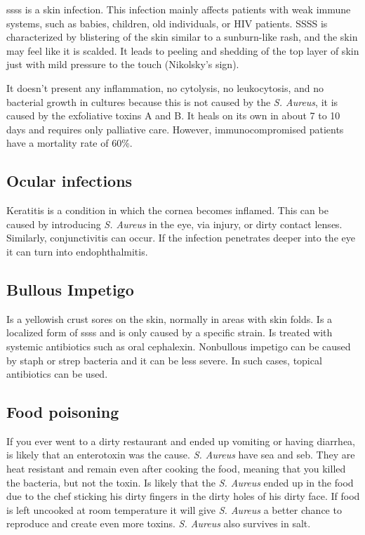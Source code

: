 \gls{ssss} is a skin infection. This infection mainly affects patients with weak immune systems, such as babies, children, old individuals, or HIV patients. SSSS is characterized by blistering of the skin similar to a sunburn-like rash, and the skin may feel like it is scalded. It leads to peeling and shedding of the top layer of skin just with mild pressure to the touch (Nikolsky's sign).

It doesn't present any inflammation, no cytolysis, no leukocytosis, and no bacterial growth in cultures because this is not caused by the \textit{S. Aureus}, it is caused by the exfoliative toxins A and B. It heals on its own in about 7 to 10 days and requires only palliative care. However, immunocompromised patients have a mortality rate of 60\%.

\subsection{Ocular infections}

Keratitis is a condition in which the cornea becomes inflamed. This can be caused by introducing \textit{S. Aureus} in the eye, via injury, or dirty contact lenses. Similarly, conjunctivitis can occur. If the infection penetrates deeper into the eye it can turn into endophthalmitis. \cite{MURUGAN2010}

\subsection{Bullous Impetigo}

Is a yellowish crust sores on the skin, normally in areas with skin folds. Is a localized form of \gls{ssss} and is only caused by a specific strain. Is treated with systemic antibiotics such as oral cephalexin. Nonbullous impetigo can be caused by staph or strep bacteria and it can be less severe. In such cases, topical antibiotics can be used.

\subsection{Food poisoning}

If you ever went to a dirty restaurant and ended up vomiting or having diarrhea, is likely that an enterotoxin was the cause. \textit{S. Aureus} have \gls{sea} and \gls{seb}. They are heat resistant and remain even after cooking the food, meaning that you killed the bacteria, but not the toxin. Is likely that the \textit{S. Aureus} ended up in the food due to the chef sticking his dirty fingers in the dirty holes of his dirty face. If food is left uncooked at room temperature it will give \textit{S. Aureus} a better chance to reproduce and create even more toxins. \textit{S. Aureus} also survives in salt.

